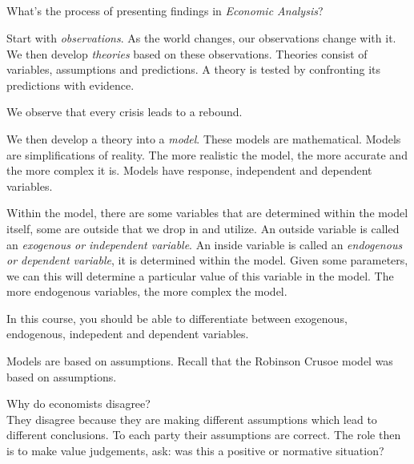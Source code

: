 \subsection{}

What's the process of presenting findings in \emph{Economic Analysis}?

Start with \emph{observations}.
As the world changes, our observations change with it.
We then develop \emph{theories} based on these observations.
Theories consist of variables, assumptions and predictions.
A theory is tested by confronting its predictions with evidence.
\begin{example}
    We observe that every crisis leads to a rebound.
\end{example}

We then develop a theory into a \emph{model}. These models are mathematical.
Models are simplifications of reality.
The more realistic the model, the more accurate and the more complex it is.
Models have response, independent and dependent variables.

Within the model, there are some variables that are determined within the model itself, some are outside that we drop in and utilize.
An outside variable is called an \emph{exogenous or independent variable}. 
An inside variable is called an \emph{endogenous or dependent variable}, it is determined within the model. Given some parameters, we can this will determine a particular value of this variable in the model.
The more endogenous variables, the more complex the model.

In this course, you should be able to differentiate between exogenous, endogenous, indepedent and dependent variables.

Models are based on assumptions.
Recall that the Robinson Crusoe model was based on assumptions.

Why do economists disagree?\\
They disagree because they are making different assumptions which lead to different conclusions. To each party their assumptions are correct.
The role then is to make value judgements, ask: was this a positive or normative situation?

